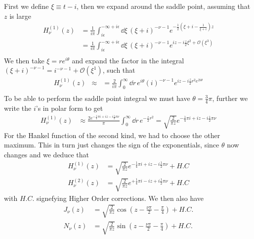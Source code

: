 \documentclass[a4paper,12pt]{article}
\begin{document}
First we define $\xi\equiv t-i$, then we expand around the saddle point, assuming that $z$ is large
\begin{equation}
	\begin{aligned}
		H_\nu^{(1)}(z)&=\frac{1}{i\pi }\int_{i\epsilon}^{-\infty+i\epsilon}\dd \xi\, (\xi+i)^{-\nu-1}e^{-\frac{1}{2}(\xi+i-\frac{1}{\xi+i})z}\\
		&=\frac{1}{i\pi }\int_{i\epsilon}^{-\infty+i\epsilon}\dd \xi\, (\xi+i)^{-\nu-1}e^{iz-i\frac{z}{2}\xi^2+\mathcal{O}(\xi^3)}\\
	\end{aligned}
\end{equation}
We then take $\xi=r e^{i\theta}$ and expand the factor in the integral 
$(\xi+i)^{-\nu-1}=i^{-\nu-1}+\mathcal{O}(\xi^1)$, such that
\begin{equation}
	\begin{aligned}
		H_\nu^{(1)}(z)&\approx
		&=\frac{2}{i\pi }\int_{0}^{\infty}\dd r\, e^{i\theta}(i)^{-\nu-1}e^{iz-i\frac{z}{2}r^2e^{2i\theta}}\\
	\end{aligned}
\end{equation}
To be able to perform the saddle point integral we must have $\theta=\frac{3}{4}\pi$, further we write the $i$'s in polar form to get
\begin{equation}
	\begin{aligned}
		H_\nu^{(1)}(z)&\approx
		\frac{2e^{-\frac{1}{4} \pi i+iz-i\frac{1}{2}\pi\nu}}{\pi }
		\int_{0}^{\infty}\dd r\, e^{-\frac{z}{2}r^2}=\sqrt{\frac{2}{\pi z}}e^{-\frac{1}{4} \pi i+iz-i\frac{1}{2}\pi\nu}
		\end{aligned}
	\end{equation}
For the Hankel function of the second kind, we had to choose the other maximum. This in turn just changes the sign of the exponentials, since $\theta$ now changes and we deduce that
\begin{equation}
	\begin{aligned}
		H_\nu^{(1)}(z)
		&=\sqrt{\frac{2}{\pi z}}e^{-\frac{1}{4} \pi i+iz-i\frac{1}{2}\pi\nu}+H.C\\
		H_\nu^{(2)}(z)
		&=\sqrt{\frac{2}{\pi z}}e^{+\frac{1}{4} \pi i-iz+i\frac{1}{2}\pi\nu}+H.C
	\end{aligned}
\end{equation}
with $H.C.$ signefying Higher Order corrections. We then also have
\begin{equation}
	\begin{aligned}
		J_\nu(z)&=\sqrt{\frac{2}{\pi z}}\cos(z-\frac{\nu \pi}{2}-\frac{ \pi}{4})+ H.C.\\
		N_\nu(z)&=\sqrt{\frac{2}{\pi z}}\sin(z-\frac{\nu \pi}{2}-\frac{ \pi}{4})+ H.C.
	\end{aligned}
\end{equation}
\end{document}
